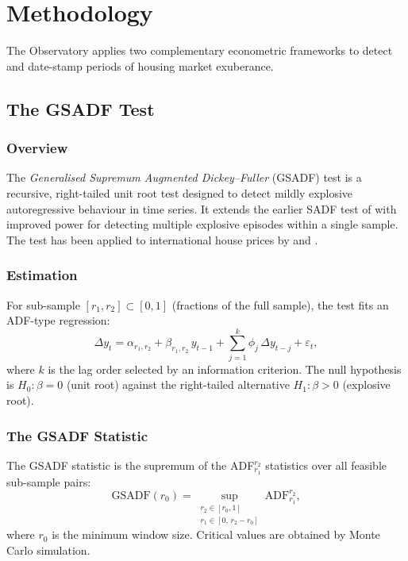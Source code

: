 \section{Methodology}
\label{sec:methodology}

The Observatory applies two complementary econometric frameworks to detect
and date-stamp periods of housing market exuberance.

\subsection{The GSADF Test}
\label{subsec:gsadf}

\subsubsection{Overview}

The \textit{Generalised Supremum Augmented Dickey--Fuller} (GSADF) test
\citep{phillips2015a, phillips2015b} is a recursive, right-tailed unit root
test designed to detect mildly explosive autoregressive behaviour in time
series. It extends the earlier SADF test of \citet{phillips2015a} with
improved power for detecting multiple explosive episodes within a single
sample. The test has been applied to international house prices by
\citet{pavlidis2016} and \citet{pavlidis2018}.

\subsubsection{Estimation}

For sub-sample $[r_1, r_2] \subset [0, 1]$ (fractions of the full sample),
the test fits an ADF-type regression:
\begin{equation}
  \label{eq:adf}
  \Delta y_t = \alpha_{r_1, r_2}
             + \beta_{r_1, r_2}\, y_{t-1}
             + \sum_{j=1}^{k} \phi_j\, \Delta y_{t-j}
             + \varepsilon_t,
\end{equation}
where $k$ is the lag order selected by an information criterion. The
null hypothesis is $H_0\colon \beta = 0$ (unit root) against the
right-tailed alternative $H_1\colon \beta > 0$ (explosive root).

\subsubsection{The GSADF Statistic}

The GSADF statistic is the supremum of the ADF$_{r_1}^{r_2}$ statistics
over all feasible sub-sample pairs:
\begin{equation}
  \label{eq:gsadf}
  \mathrm{GSADF}(r_0) = \sup_{\substack{r_2 \in [r_0, 1] \\
                                        r_1 \in [0,\, r_2 - r_0]}}
                        \mathrm{ADF}_{r_1}^{r_2},
\end{equation}
where $r_0$ is the minimum window size. Critical values are obtained by
Monte Carlo simulation.

